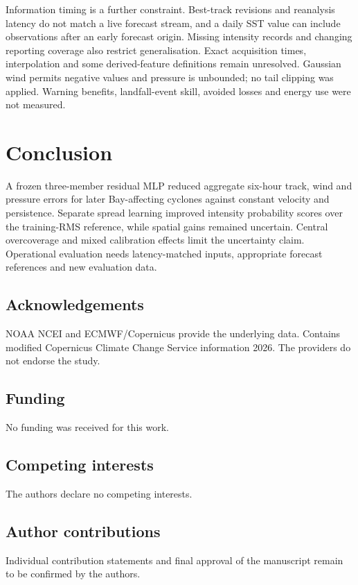 \documentclass[pdflatex,sn-mathphys-num,referee,a4paper]{sn-jnl}
\begin{document}
Information timing is a further constraint. Best-track revisions and reanalysis latency do not match a live forecast stream, and a daily SST value can include observations after an early forecast origin. Missing intensity records and changing reporting coverage also restrict generalisation. Exact acquisition times, interpolation and some derived-feature definitions remain unresolved. Gaussian wind permits negative values and pressure is unbounded; no tail clipping was applied. Warning benefits, landfall-event skill, avoided losses and energy use were not measured.


\section{Conclusion}
A frozen three-member residual MLP reduced aggregate six-hour track, wind and pressure errors for later Bay-affecting cyclones against constant velocity and persistence. Separate spread learning improved intensity probability scores over the training-RMS reference, while spatial gains remained uncertain. Central overcoverage and mixed calibration effects limit the uncertainty claim. Operational evaluation needs latency-matched inputs, appropriate forecast references and new evaluation data.


\backmatter

\subsection*{Acknowledgements}
NOAA NCEI and ECMWF/Copernicus provide the underlying data. Contains modified Copernicus Climate Change Service information 2026. The providers do not endorse the study.

\subsection*{Funding}
No funding was received for this work.

\subsection*{Competing interests}
The authors declare no competing interests.

\subsection*{Author contributions}
Individual contribution statements and final approval of the manuscript remain to be confirmed by the authors.
\end{document}
